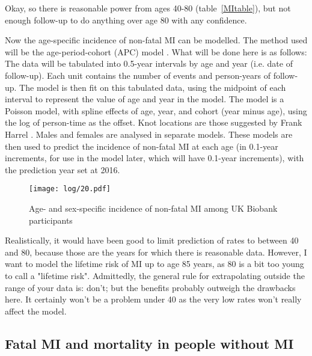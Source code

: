 \documentclass[11pt]{article}
\begin{document}
Okay, so there is reasonable power from ages 40-80 (table~\ref{MItable}), 
but not enough follow-up to do anything over age 80 with any confidence. 

Now the age-specific incidence of non-fatal MI can be modelled.
The method used will be the age-period-cohort (APC) model \cite{CarstensenSTATMED2007}.
What will be done here is as follows:
The data will be tabulated into 0.5-year intervals by age and year (i.e. date of follow-up).
Each unit contains the number of events and person-years of follow-up. The model is then fit on
this tabulated data, using the midpoint of each interval to represent the value of age and year
in the model. The model is a Poisson model, with spline effects of age, year, and cohort (year minus
age), using the log of person-time as the offset. Knot locations are those suggested by Frank Harrel \cite{Harrell2001Springer}.
Males and females are analysed in separate models. 
These models are then used to predict the incidence of non-fatal MI at each age (in 0.1-year increments,
for use in the model later, which will have 0.1-year increments), with the prediction year set at 2016. 

\color{Blue4}
\begin{stlog}\end{stlog}
\begin{figure}
    \centering
    \texttt{[image: log/20.pdf]}
    \caption{Age- and sex-specific incidence of non-fatal MI among UK Biobank participants}
    \label{MIinc}
\end{figure}
\begin{stlog}\end{stlog}
\color{black}

Realistically, it would have been good to limit prediction of rates to between 40 and 80, 
because those are the years for which there is reasonable data. However, I want to
model the lifetime risk of MI up to age 85 years, as 80 is a bit too
young to call a "lifetime risk". Admittedly, the general rule for extrapolating outside the range of your data is: don't; 
but the benefits probably outweigh the drawbacks here. It certainly won't be a problem under 40 as the very 
low rates won't really affect the model.

\subsection{Fatal MI and mortality in people without MI}
\end{document}
